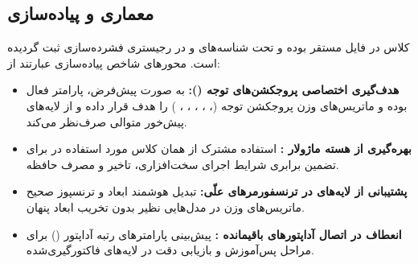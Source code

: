 \subsection{معماری و پیاده‌سازی}
کلاس  در فایل  مستقر بوده و تحت شناسه‌های  و  در رجیستری فشرده‌سازی ثبت گردیده است. محورهای شاخص پیاده‌سازی عبارتند از:
\begin{itemize}
    \item \textbf{هدف‌گیری اختصاصی پروجکشن‌های توجه ():} به صورت پیش‌فرض، پارامتر  فعال بوده و ماتریس‌های وزن پروجکشن توجه (، ، ، ، ، ) را هدف قرار داده و از لایه‌های پیش‌خور متوالی صرف‌نظر می‌کند.
    \item \textbf{بهره‌گیری از هسته ماژولار :} استفاده مشترک از همان کلاس  مورد استفاده در  برای تضمین برابری شرایط اجرای سخت‌افزاری، تاخیر و مصرف حافظه.
    \item \textbf{پشتیبانی از لایه‌های  در ترنسفورمرهای علّی:} تبدیل هوشمند ابعاد و ترنسپوز صحیح ماتریس‌های وزن در مدل‌هایی نظیر  بدون تخریب ابعاد پنهان.
    \item \textbf{انعطاف در اتصال آداپتورهای باقیمانده :} پیش‌بینی پارامترهای رتبه آداپتور () برای مراحل پس‌آموزش و بازیابی دقت در لایه‌های فاکتورگیری‌شده.
\end{itemize}

